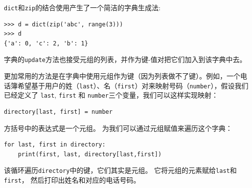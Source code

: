 
\lstinline{dict}和\lstinline{zip}的结合使用产生了一个简洁的字典生成法:

\begin{lstlisting}
>>> d = dict(zip('abc', range(3)))
>>> d
{'a': 0, 'c': 2, 'b': 1}
\end{lstlisting}

%


字典的\lstinline{update}方法也接受元组的列表，并作为键-值对把它们加入到该字典中去。
  


更加常用的方法是在字典中使用元组作为键（因为列表做不了键）。例如，一个电话簿希望基于用户的姓（\lstinline {last}）、名（\lstinline {first}）对来映射号码（\lstinline {number}），假设我们已经定义了 \lstinline {last}, \lstinline {first} 和 \lstinline {number}三个变量，我们可以这样实现映射：

\begin{lstlisting}
directory[last, first] = number
\end{lstlisting}

%

方括号中的表达式是一个元组。 为我们可以通过元组赋值来遍历这个字典：

\begin{lstlisting}
for last, first in directory:
    print(first, last, directory[last,first])
\end{lstlisting}

%

该循环遍历\lstinline{directory}中的键，它们其实是元组。
它将元组的元素赋给\lstinline{last}和\lstinline{first}， 然后打印出姓名和对应的电话号码。

